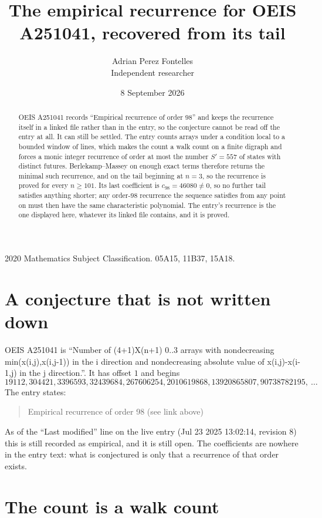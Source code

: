 \documentclass[11pt,a4paper]{article}
\title{The empirical recurrence for OEIS A251041, recovered from its tail}
\author{Adrian Perez Fontelles\\ \small Independent researcher}
\date{8 September 2026}
\theoremstyle{plain}
\theoremstyle{definition}
\begin{document}
\maketitle

\begin{abstract}
OEIS A251041 records ``Empirical recurrence of order $98$'' and keeps the recurrence itself in
a linked file rather than in the entry, so the conjecture cannot be read off the entry at all.
It can still be settled. The entry counts arrays under a condition local to a bounded window of
lines, which makes the count a walk count on a finite digraph and forces a monic integer
recurrence of order at most the number $S'=557$ of states with distinct futures. Berlekamp--Massey on
enough exact terms therefore returns the minimal such recurrence, and on the tail beginning at $n=3$, so the recurrence is proved for every $n\ge101$.
Its last coefficient is $c_{98}=46080\neq0$, so no further tail satisfies anything
shorter; any order-$98$ recurrence the sequence satisfies from any point on must then have
the same characteristic polynomial. The entry's recurrence is the one displayed here, whatever
its linked file contains, and it is proved.
\end{abstract}

\noindent\small 2020 Mathematics Subject Classification. 05A15, 11B37, 15A18.\normalsize

\section{A conjecture that is not written down}

OEIS A251041 is ``Number of (4+1)X(n+1) 0..3 arrays with nondecreasing min(x(i,j),x(i,j-1)) in the i direction and nondecreasing absolute value of x(i,j)-x(i-1,j) in the j direction.''. It has offset $1$ and begins
\[
19112, 304421, 3396593, 32439684, 267606254, 2010619868, 13920865807, 90738782195,\ \dots
\]
The entry states:
\begin{quote}
Empirical recurrence of order 98 (see link above)
\end{quote}
As of the ``Last modified'' line on the live entry (Jul 23 2025 13:02:14, revision 8)
this is still recorded as empirical, and it is still open. The coefficients are nowhere in the
entry text: what is conjectured is only that a recurrence of that order exists.

\section{The count is a walk count}
\end{document}
